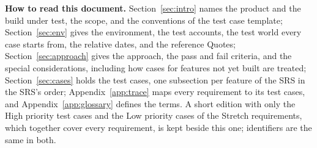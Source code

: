 \noindent\textbf{How to read this document.} Section~\ref{sec:intro} names the product and the build under test, the scope, and the conventions of the test case template; Section~\ref{sec:env} gives the environment, the test accounts, the test world every case starts from, the relative dates, and the reference Quotes; Section~\ref{sec:approach} gives the approach, the pass and fail criteria, and the special considerations, including how cases for features not yet built are treated; Section~\ref{sec:cases} holds the test cases, one subsection per feature of the SRS in the SRS's order; Appendix~\ref{app:trace} maps every requirement to its test cases, and Appendix~\ref{app:glossary} defines the terms. A short edition with only the High priority test cases and the Low priority cases of the Stretch requirements, which together cover every requirement, is kept beside this one; identifiers are the same in both.

\tableofcontents
\clearpage
